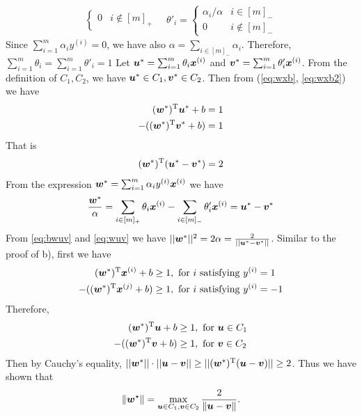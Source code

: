 \documentclass[a4paper,answers,12pt]{exam} %
\begin{document}
\begin{questions}
\begin{solution}
\begin{align*}
\begin{cases}
0 & i \not\in [m]_+
\end{cases}\quad \theta'_i =  \begin{cases} 
\alpha_i / \alpha & i \in [m]_- \\
0 & i \not\in [m]_-
\end{cases}
\end{align*}
Since $\sum_{i=1}^m \alpha_i y^{(i)} = 0$,
we have also $\alpha = \sum_{i\in [m]_-} \alpha_i$. Therefore,
$\sum_{i=1}^m \theta_i = \sum_{i=1}^m \theta'_i = 1$
Let $\bm{u}^* = \sum_{i=1}^m \theta_i \bm{x}^{(i)}$
and $\bm{v}^*= \sum_{i=1}^m \theta'_i \bm{x}^{(i)}$.
From the definition of $C_1, C_2$, we have
$\bm{u}^* \in C_1, \bm{v}^* \in C_2$. Then from
(\ref{eq:wxb}, \ref{eq:wxb2}) we have
\begin{align*}
              (\bm{w}^*)^{\mathrm{T}} \bm{u}^* + b &= 1\\
      -((\bm{w}^*)^{\mathrm{T}} \bm{v}^* + b) &= 1 
\end{align*}
That is
\begin{equation}\label{eq:bwuv}
    (\bm{w}^*)^{\mathrm{T}}(\bm{u}^* - \bm{v}^*) = 2
\end{equation}
From the expression $\bm{w}^* = \sum_{i=1}^m \alpha_i y^{(i)} \bm{x}^{(i)}$ we have
\begin{equation}\label{eq:wuv}
    \frac{\bm{w}^*}{\alpha} = \sum_{i \in [m]_+}
    \theta_i \bm{x}^{(i)} - \sum_{i \in [m]_-}
    \theta'_i \bm{x}^{(i)}
    = \bm{u}^* - \bm{v} ^*
\end{equation}
From \eqref{eq:bwuv} and \eqref{eq:wuv} we have
$||\bm{w}^*||^2 = 2 \alpha  = \frac{2}{||\bm{u}^* - \bm{v}^*||}$.
Similar to the proof of b), first we have
  \begin{align*}
      (\bm{w}^*)^{\mathrm{T}} \bm{x}^{(i)} + b &\geq 1, \textrm{ for } i \textrm{ satisfying } y^{(i)} = 1 \\
      -((\bm{w}^*)^{\mathrm{T}} \bm{x}^{(j)} + b) & \geq 1, \textrm{ for } i \textrm{ satisfying } y^{(i)} = -1
  \end{align*}
  Therefore,
    \begin{align*}
      (\bm{w}^*)^{\mathrm{T}} \bm{u} + b &\geq 1, \textrm{ for } \bm{u} \in C_1\\
      -((\bm{w}^*)^{\mathrm{T}} \bm{v} + b) & \geq 1, \textrm{ for } \bm{v} \in C_2
  \end{align*}
  Then by Cauchy's equality, 
  $|| \bm{w}^* || \cdot ||\bm{u} - \bm{v} || \geq || (\bm{w}^*)^{\mathrm{T}} (\bm{u} - \bm{v})|| \geq 2$. Thus we have shown that
    \begin{equation*}
    \|\bm{w}^\star\| = \max_{\bm{u} \in C_1, \bm{v} \in C_2}\frac{2}{\|\bm{u} - \bm{v}\|}.
  \end{equation*}
\end{solution}

\end{questions}
\end{document}
